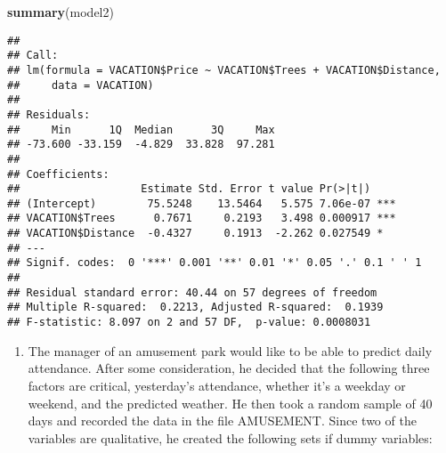\documentclass[]{article}
\newenvironment{Shaded}{\begin{snugshade}}{\end{snugshade}}
\newcommand{\KeywordTok}[1]{\textcolor[rgb]{0.13,0.29,0.53}{\textbf{#1}}}
\newcommand{\NormalTok}[1]{#1}
\providecommand{\tightlist}{%
  \setlength{\itemsep}{0pt}\setlength{\parskip}{0pt}}
\begin{document}
\begin{Shaded}
\begin{Highlighting}[]
\KeywordTok{summary}\NormalTok{(model2)}
\end{Highlighting}
\end{Shaded}

\begin{verbatim}
## 
## Call:
## lm(formula = VACATION$Price ~ VACATION$Trees + VACATION$Distance, 
##     data = VACATION)
## 
## Residuals:
##     Min      1Q  Median      3Q     Max 
## -73.600 -33.159  -4.829  33.828  97.281 
## 
## Coefficients:
##                   Estimate Std. Error t value Pr(>|t|)    
## (Intercept)        75.5248    13.5464   5.575 7.06e-07 ***
## VACATION$Trees      0.7671     0.2193   3.498 0.000917 ***
## VACATION$Distance  -0.4327     0.1913  -2.262 0.027549 *  
## ---
## Signif. codes:  0 '***' 0.001 '**' 0.01 '*' 0.05 '.' 0.1 ' ' 1
## 
## Residual standard error: 40.44 on 57 degrees of freedom
## Multiple R-squared:  0.2213, Adjusted R-squared:  0.1939 
## F-statistic: 8.097 on 2 and 57 DF,  p-value: 0.0008031
\end{verbatim}

\begin{enumerate}
\def\labelenumi{\arabic{enumi}.}
\setcounter{enumi}{1}
\tightlist
\item
  The manager of an amusement park would like to be able to predict
  daily attendance. After some consideration, he decided that the
  following three factors are critical, yesterday's attendance, whether
  it's a weekday or weekend, and the predicted weather. He then took a
  random sample of 40 days and recorded the data in the file AMUSEMENT.
  Since two of the variables are qualitative, he created the following
  sets if dummy variables:
\end{enumerate}
\end{document}
